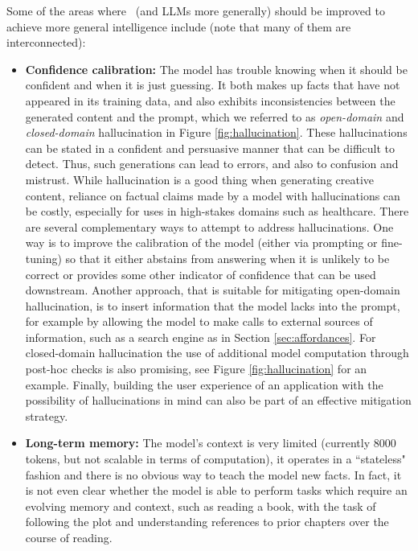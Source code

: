 Some of the areas where \DV\ (and LLMs more generally) should be improved to achieve more general intelligence include (note that many of them are interconnected):
\begin{itemize}
    \item \textbf{Confidence calibration:} The model has trouble knowing when it should be confident and when it is just guessing. It both makes up facts that have not appeared in its training data, and also exhibits inconsistencies between the generated content and the prompt, which we referred to as {\em open-domain} and {\em closed-domain} hallucination in Figure \ref{fig:hallucination}. These hallucinations can be stated in a confident and persuasive manner that can be difficult to detect. Thus, such generations can lead to errors, and also to confusion and mistrust. While hallucination is a good thing when generating creative content, reliance on factual claims made by a model with hallucinations can be costly, especially for uses in high-stakes domains such as healthcare. There are several complementary ways to attempt to address hallucinations. One way is to improve the calibration of the model (either via prompting or fine-tuning) so that it either abstains from answering when it is unlikely to be correct or provides some other indicator of confidence that can be used downstream. Another approach, that is suitable for mitigating open-domain hallucination, is to insert information that the model lacks into the prompt, for example by allowing the model to make calls to external sources of information, such as a search engine as in Section \ref{sec:affordances}. For closed-domain hallucination the use of additional model computation through post-hoc checks is also promising, see Figure \ref{fig:hallucination} for an example. Finally, building the user experience of an application with the possibility of hallucinations in mind can also be part of an effective mitigation strategy. %
    \item \textbf{Long-term memory:} The model's context is very limited (currently 8000 tokens, but not scalable in terms of computation), it operates in a ``stateless" fashion and there is no obvious way to teach the model new facts. In fact, it is not even clear whether the model is able to perform tasks which require an evolving memory and context, such as reading a book, with the task of following the plot and understanding references to prior chapters over the course of reading.

\end{itemize}
